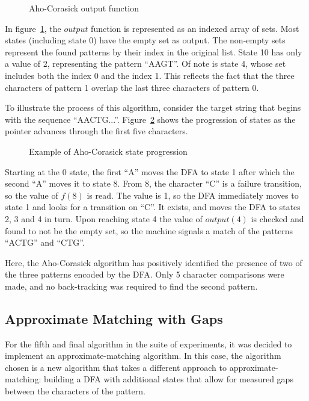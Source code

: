 \begin{figure}[ht]
\centering

\caption{Aho-Corasick output function}
\label{fig:ac_output_function}
\end{figure}

In figure~\ref{fig:ac_output_function}, the $output$ function is represented as an indexed array of sets. Most states (including state 0) have the empty set as output. The non-empty sets represent the found patterns by their index in the original list. State 10 has only a value of 2, representing the pattern ``AAGT''. Of note is state 4, whose set includes both the index 0 and the index 1. This reflects the fact that the three characters of pattern 1 overlap the last three characters of pattern 0.

To illustrate the process of this algorithm, consider the target string that begins with the sequence ``AACTG...''. Figure~\ref{fig:ac_progression} shows the progression of states as the pointer advances through the first five characters.

\begin{figure}[ht]
\centering

\caption{Example of Aho-Corasick state progression}
\label{fig:ac_progression}
\end{figure}

Starting at the 0 state, the first ``A'' moves the DFA to state 1 after which the second ``A'' moves it to state 8. From 8, the character ``C'' is a failure transition, so the value of $f(8)$ is read. The value is 1, so the DFA immediately moves to state 1 and looks for a transition on ``C''. It exists, and moves the DFA to states 2, 3 and 4 in turn. Upon reaching state 4 the value of $output(4)$ is checked and found to not be the empty set, so the machine signals a match of the patterns ``ACTG'' and ``CTG''.

Here, the Aho-Corasick algorithm has positively identified the presence of two of the three patterns encoded by the DFA. Only 5 character comparisons were made, and no back-tracking was required to find the second pattern.

\subsection{Approximate Matching with Gaps}

For the fifth and final algorithm in the suite of experiments, it was decided to implement an approximate-matching algorithm. In this case, the algorithm chosen is a new algorithm that takes a different approach to approximate-matching: building a DFA with additional states that allow for measured gaps between the characters of the pattern.

